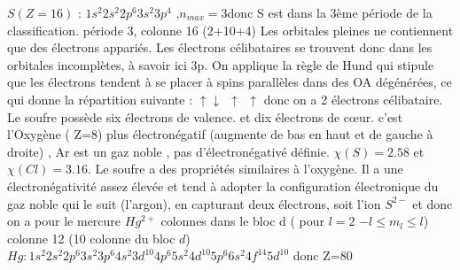 \begin{Answer}
	\ExePart[title=Le soufre]
	\Question $S(Z=16)$ : $1s^2 2s^2 2p^6 3s^2 3p^4$ ,$n_{max} = 3$donc S est dans la 3ème période de la classification.
	période 3, colonne 16 (2+10+4)
	\Question Les orbitales pleines ne contiennent que des électrons appariés. Les électrons célibataires se
	trouvent donc dans les orbitales incomplètes, à savoir ici
	3p. On applique la règle de Hund qui stipule que les électrons tendent à se placer à spins parallèles dans des OA dégénérées, ce qui donne la répartition suivante : $\uparrow\downarrow ~~\uparrow~~\uparrow$ donc on a 2 électrons célibataire. Le soufre possède six électrons de valence. et dix électrons de cœur.
	\Question c'est l'Oxygène ( Z=8) plus électronégatif (augmente de bas en haut et de gauche à droite)
	\Question , Ar est un gaz noble , pas d'électronégativé définie. $\chi (S)=2.58$ et $\chi(Cl)=3.16$.
	\ExePart[title=le cinabre]
	\Question Le soufre a des propriétés similaires à l’oxygène. Il a une électronégativité assez élevée et tend à adopter la configuration électronique du gaz noble qui le suit (l’argon), en capturant deux électrons, soit l'ion $S^{2-}$ et donc on a pour le mercure $Hg^{2+}$
	 colonnes dans le bloc d ( pour $l=2$ $-l\leq m_l\leq l$)
	\Question colonne 12 (10 colonne du bloc $d$)
	\Question  $Hg:1s^2 2s^2 2p^6 3s^2 3p^6 4s^2 3d^{10} 4p^6 5s^2 4d^{10} 5p^6 6s^2 4f^{14} 5d^{10}$  donc Z=80

\end{Answer}
